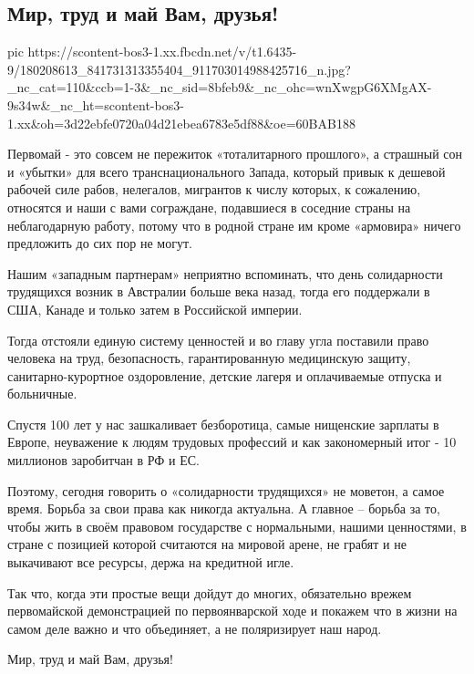  
 
 
 
 
\subsection{Мир, труд и май Вам, друзья!}
\label{sec:01_05_2021.fb.muraev_evgenij.1.pervomaj}

\ifcmt
  pic https://scontent-bos3-1.xx.fbcdn.net/v/t1.6435-9/180208613_841731313355404_911703014988425716_n.jpg?_nc_cat=110&ccb=1-3&_nc_sid=8bfeb9&_nc_ohc=wnXwgpG6XMgAX-9s34w&_nc_ht=scontent-bos3-1.xx&oh=3d22ebfe0720a04d21ebea6783e5df88&oe=60BAB188
\fi

Первомай - это совсем не пережиток «тоталитарного прошлого», а страшный сон и
«убытки» для всего транснационального Запада, который привык к дешевой рабочей
силе рабов, нелегалов, мигрантов к числу которых, к сожалению, относятся и наши
с вами сограждане, подавшиеся в соседние страны на неблагодарную работу, потому
что в родной стране им кроме «армовира» ничего предложить до сих пор не могут.

Нашим «западным партнерам» неприятно вспоминать, что день солидарности
трудящихся возник в Австралии больше века назад, тогда его поддержали в США,
Канаде и только затем в Российской империи. 

Тогда отстояли единую систему ценностей и во главу угла поставили право
человека на труд, безопасность, гарантированную медицинскую защиту,
санитарно-курортное оздоровление, детские лагеря и оплачиваемые отпуска и
больничные.

Спустя 100 лет  у нас зашкаливает безборотица, самые нищенские зарплаты в
Европе, неуважение к людям трудовых профессий и как закономерный итог - 10
миллионов заробитчан в РФ и ЕС.

Поэтому, сегодня говорить о «солидарности трудящихся» не моветон, а самое
время. Борьба за свои права как никогда актуальна. А главное – борьба за то,
чтобы жить в своём правовом государстве с нормальными, нашими ценностями, в
стране с позицией которой считаются на мировой арене, не грабят и не выкачивают
все ресурсы, держа на кредитной игле.

Так что, когда эти простые вещи дойдут до многих, обязательно врежем
первомайской демонстрацией по первоянварской ходе и покажем что в жизни на
самом деле важно и что объединяет, а не поляризирует наш народ. 

Мир, труд и май Вам, друзья!
